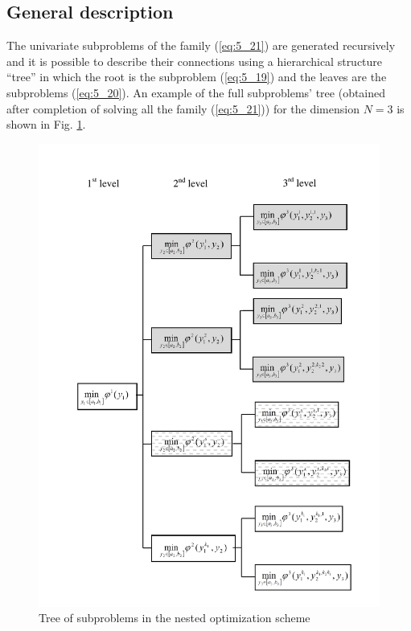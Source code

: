 \subsection {General description}
\label{subsec:5_4_1}
The univariate subproblems of the family (\ref{eq:5_21}) are generated recursively and it is possible to describe their connections using a hierarchical structure “tree” in which  the root is the subproblem (\ref{eq:5_19}) and the leaves are the subproblems (\ref{eq:5_20}). An example of the full subproblems’  tree (obtained after completion of solving all the family (\ref{eq:5_21})) for the dimension $N=3$  is shown in Fig. \ref{fig:5_9}.
\begin{figure}[ht]
\centering
\includegraphics[width=1.0\linewidth]{figures/figure_5_9.pdf}
\caption{Tree of subproblems in the nested optimization scheme}
\label{fig:5_9}    
\end{figure}

